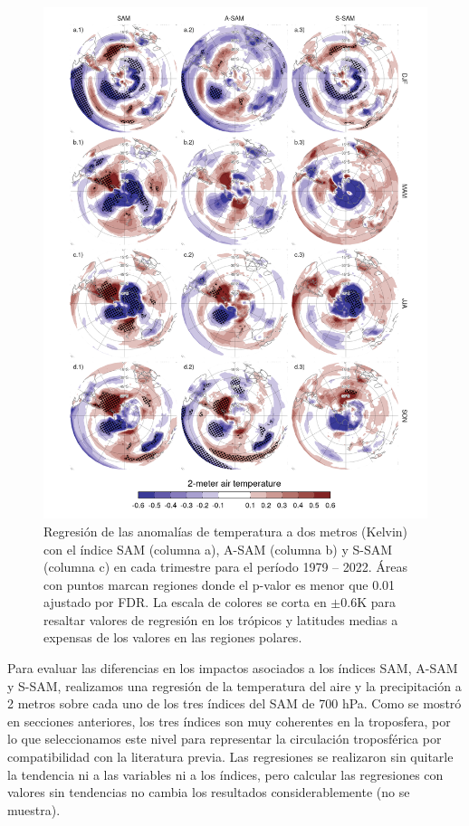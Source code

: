 \documentclass[12pt,oneside]{reedthesis}
\begin{document}
\begin{figure}
\includegraphics{figures/30-sam/regr-air-season-1} \caption{Regresión de las anomalías de temperatura a dos metros (Kelvin) con el índice SAM (columna a), A-SAM (columna b) y S-SAM (columna c) en cada trimestre para el período 1979 -- 2022.
Áreas con puntos marcan regiones donde el p-valor es menor que 0.01 ajustado por FDR.
La escala de colores se corta en \(\pm0.6 \mathrm{K}\) para resaltar valores de regresión en los trópicos y latitudes medias a expensas de los valores en las regiones polares.}\label{fig:regr-air-season}
\end{figure}

Para evaluar las diferencias en los impactos asociados a los índices SAM, A-SAM y S-SAM, realizamos una regresión de la temperatura del aire y la precipitación a 2 metros sobre cada uno de los tres índices del SAM de 700 hPa.
Como se mostró en secciones anteriores, los tres índices son muy coherentes en la troposfera, por lo que seleccionamos este nivel para representar la circulación troposférica por compatibilidad con la literatura previa.
Las regresiones se realizaron sin quitarle la tendencia ni a las variables ni a los índices, pero calcular las regresiones con valores sin tendencias no cambia los resultados considerablemente (no se muestra).
\end{document}
